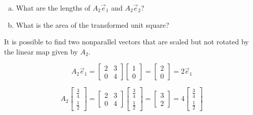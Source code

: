 \begin{applicationActivities}
\begin{activity}{5}
\begin{center}
\end{center}

\begin{enumerate}[(a)]
\item What are the lengths of \(A_2\vec e_1\) and \(A_2\vec e_2\)?
\item What is the area of the transformed unit square?
\end{enumerate}
\end{activity}

\begin{observation}
  It is possible to find two nonparallel vectors that are scaled but not rotated by
  the linear map given by \(A_2\).

\begin{multicols}{2}
  \[A_2\vec e_1=\begin{bmatrix} 2 & 3 \\ 0 & 4 \end{bmatrix}\begin{bmatrix}1\\0\end{bmatrix}
  =\begin{bmatrix}2\\0\end{bmatrix}=2\vec e_1\]

  \[
    A_2\begin{bmatrix}\frac{3}{4}\\\frac{1}{2}\end{bmatrix}
      =
    \begin{bmatrix} 2 & 3 \\ 0 & 4 \end{bmatrix}\begin{bmatrix}\frac{3}{4}\\\frac{1}{2}\end{bmatrix}
      =
    \begin{bmatrix}3\\2\end{bmatrix}
      =
    4\begin{bmatrix}\frac{3}{4}\\\frac{1}{2}\end{bmatrix}
  \]


\end{multicols}
\end{observation}
\end{applicationActivities}
